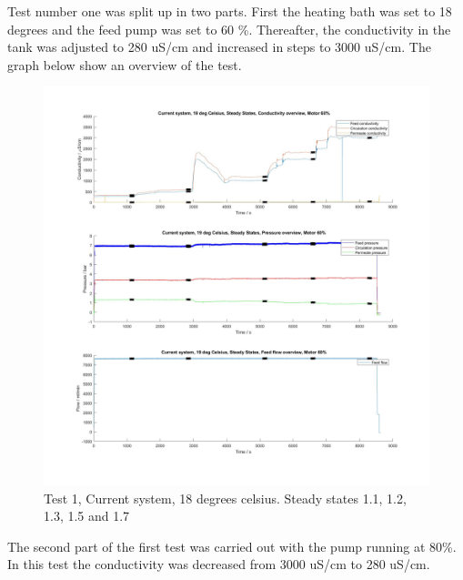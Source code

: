 \newpage
Test number one was split up in two parts. First the heating bath was set to 18 degrees and the feed pump was set to 60 \%. Thereafter, the conductivity in the tank was adjusted to 280 uS/cm and increased in steps to 3000 uS/cm. The graph below show an overview of the test.

\begin{figure}[H]
    \centering
    \includegraphics[width=1.1\textwidth]{overview20_60}
    \caption{Test 1, Current system, 18 degrees celsius. Steady states 1.1, 1.2, 1.3, 1.5 and 1.7 }
    \label{fig:PressConn}
\end{figure}

\newpage

The second part of the first test was carried out with the pump running at 80\%. In this test the conductivity was decreased from 3000 uS/cm to 280 uS/cm.
  
